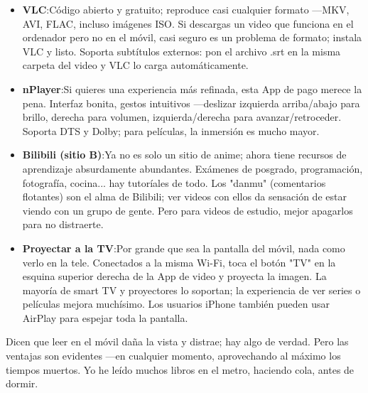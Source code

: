 \begin{itemize}
  \item \textbf{VLC}:Código abierto y gratuito; reproduce casi cualquier formato —MKV, AVI, FLAC, incluso imágenes ISO. Si descargas un video que funciona en el ordenador pero no en el móvil, casi seguro es un problema de formato; instala VLC y listo. Soporta subtítulos externos: pon el archivo .srt en la misma carpeta del video y VLC lo carga automáticamente.
  \item \textbf{nPlayer}:Si quieres una experiencia más refinada, esta App de pago merece la pena. Interfaz bonita, gestos intuitivos —deslizar izquierda arriba/abajo para brillo, derecha para volumen, izquierda/derecha para avanzar/retroceder. Soporta DTS y Dolby; para películas, la inmersión es mucho mayor.
  \item \textbf{Bilibili (sitio B)}:Ya no es solo un sitio de anime; ahora tiene recursos de aprendizaje absurdamente abundantes. Exámenes de posgrado, programación, fotografía, cocina... hay tutoríales de todo. Los "danmu" (comentarios flotantes) son el alma de Bilibili; ver videos con ellos da sensación de estar viendo con un grupo de gente. Pero para videos de estudio, mejor apagarlos para no distraerte.
  \item \textbf{Proyectar a la TV}:Por grande que sea la pantalla del móvil, nada como verlo en la tele. Conectados a la misma Wi-Fi, toca el botón "TV" en la esquina superior derecha de la App de video y proyecta la imagen. La mayoría de smart TV y proyectores lo soportan; la experiencia de ver series o películas mejora muchísimo. Los usuarios iPhone también pueden usar AirPlay para espejar toda la pantalla.
\end{itemize}


Dicen que leer en el móvil daña la vista y distrae; hay algo de verdad. Pero las ventajas son evidentes —en cualquier momento, aprovechando al máximo los tiempos muertos. Yo he leído muchos libros en el metro, haciendo cola, antes de dormir.


